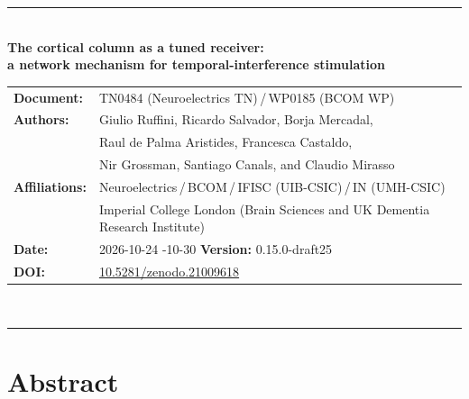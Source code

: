\documentclass[11pt,a4paper]{article}
\newif\ifsupp
\newcommand{\paperver}{0.15.0-draft25} %
\providecommand{\DIFaddtex}[1]{{\protect\color{blue} \sf #1}} %
\providecommand{\DIFdeltex}[1]{{\protect\color{red} \scriptsize #1}} %
\providecommand{\DIFaddbegin}{} %
\providecommand{\DIFaddend}{} %
\providecommand{\DIFdelbegin}{} %
\providecommand{\DIFdelend}{} %
\providecommand{\DIFadd}[1]{\texorpdfstring{\DIFaddtex{#1}}{#1}} %
\providecommand{\DIFdel}[1]{\texorpdfstring{\DIFdeltex{#1}}{}} %
\begin{document}
\vspace{6pt}
\else
\begin{flushleft}
{\color{neblue}\rule{\textwidth}{2pt}}\\[4pt]
{\LARGE\bfseries The cortical column as a tuned receiver:\\[2pt]
a network mechanism for temporal-interference stimulation}\\[10pt]
\begin{tabular}{@{}ll@{}}
\textbf{Document:} & TN0484 (Neuroelectrics TN)\,/\,WP0185 (BCOM WP) \\
\textbf{Authors:} & Giulio Ruffini, Ricardo Salvador, Borja Mercadal,\\
& Raul de Palma Aristides, Francesca Castaldo,\\
& Nir Grossman, Santiago Canals, and Claudio Mirasso \\
\textbf{Affiliations:} & Neuroelectrics\,/\,BCOM\,/\,IFISC (UIB-CSIC)\,/\,IN (UMH-CSIC)\\
& Imperial College London (Brain Sciences and UK Dementia Research Institute) \\
\textbf{Date:} & \DIFdelbegin \DIFdel{2026-10-24 }\DIFdelend \DIFaddbegin \DIFadd{2026-10-30 }\DIFaddend \qquad \textbf{Version:} \paperver \\
\textbf{DOI:} & \href{https://doi.org/10.5281/zenodo.21009618}{10.5281/zenodo.21009618} \\
\end{tabular}\\[4pt]
{\color{neblue}\rule{\textwidth}{1pt}}
\end{flushleft}
\fi

\ifsupp
\begin{center}
{\large\bfseries Supplementary Material}\\[4pt]
\begin{minipage}{0.86\textwidth}\centering\small
Additional methods, derivations, and figures accompanying the article. Sections, equations, and figures use S-prefixed numbers;
references to article equations are marked as main-text references.
\end{minipage}
\end{center}
\vspace{8pt}
\fi

\ifsupp\else
\section*{Abstract}
\end{document}
